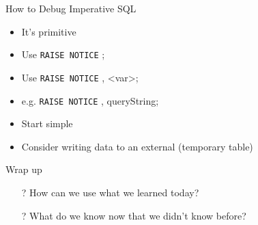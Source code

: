 \documentclass[aspectratio=169]{beamer}
\begin{document}
\begin{frame}[fragile]{How to Debug Imperative SQL}
\begin{itemize}
\item It's primitive
\item Use \texttt{RAISE NOTICE} \textquotesingle;
\item Use \texttt{RAISE NOTICE} \textquotesingle{\%}\textquotesingle, <var>;
\item e.g. \texttt{RAISE NOTICE} \textquotesingle{\%}\textquotesingle, queryString;
\item Start simple 
\item Consider writing data to an external (temporary table)
\end{itemize}
\end{frame}



\begin{frame}{Wrap up}
\begin{itemize}
	\item[?] How can we use what we learned today?
	\vspace{2em}
	\item[?] What do we know now that we didn't know before?
\end{itemize}

\end{frame}
\end{document}
